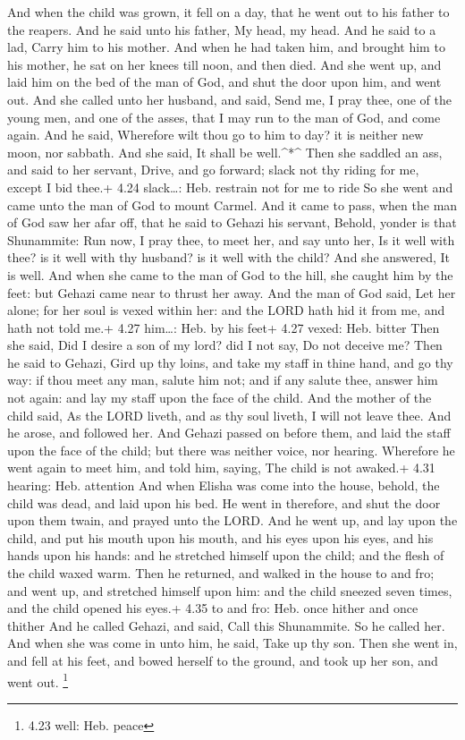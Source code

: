  And when the child was grown, it fell on a day, that he
went out to his father to the reapers.  And he said unto
his father, My head, my head. And he said to a lad, Carry him to his
mother.  And when he had taken him, and brought him to his
mother, he sat on her knees till noon, and then died.  And
she went up, and laid him on the bed of the man of God, and shut the
door upon him, and went out.  And she called unto her
husband, and said, Send me, I pray thee, one of the young men, and one
of the asses, that I may run to the man of God, and come again.
 And he said, Wherefore wilt thou go to him to day? it is
neither new moon, nor sabbath. And she said, It shall be well.\^{}*\^{}
 Then she saddled an ass, and said to her servant, Drive,
and go forward; slack not thy riding for me, except I bid thee.+ 4.24
slack\ldots: Heb. restrain not for me to ride  So she went
and came unto the man of God to mount Carmel. And it came to pass, when
the man of God saw her afar off, that he said to Gehazi his servant,
Behold, yonder is that Shunammite:  Run now, I pray thee,
to meet her, and say unto her, Is it well with thee? is it well with thy
husband? is it well with the child? And she answered, It is well.
 And when she came to the man of God to the hill, she
caught him by the feet: but Gehazi came near to thrust her away. And the
man of God said, Let her alone; for her soul is vexed within her: and
the LORD hath hid it from me, and hath not told me.+ 4.27 him\ldots:
Heb. by his feet+ 4.27 vexed: Heb. bitter  Then she said,
Did I desire a son of my lord? did I not say, Do not deceive me?
 Then he said to Gehazi, Gird up thy loins, and take my
staff in thine hand, and go thy way: if thou meet any man, salute him
not; and if any salute thee, answer him not again: and lay my staff upon
the face of the child.  And the mother of the child said,
As the LORD liveth, and as thy soul liveth, I will not leave thee. And
he arose, and followed her.  And Gehazi passed on before
them, and laid the staff upon the face of the child; but there was
neither voice, nor hearing. Wherefore he went again to meet him, and
told him, saying, The child is not awaked.+ 4.31 hearing: Heb. attention
 And when Elisha was come into the house, behold, the child
was dead, and laid upon his bed.  He went in therefore, and
shut the door upon them twain, and prayed unto the LORD. 
And he went up, and lay upon the child, and put his mouth upon his
mouth, and his eyes upon his eyes, and his hands upon his hands: and he
stretched himself upon the child; and the flesh of the child waxed warm.
 Then he returned, and walked in the house to and fro; and
went up, and stretched himself upon him: and the child sneezed seven
times, and the child opened his eyes.+ 4.35 to and fro: Heb. once hither
and once thither  And he called Gehazi, and said, Call this
Shunammite. So he called her. And when she was come in unto him, he
said, Take up thy son.  Then she went in, and fell at his
feet, and bowed herself to the ground, and took up her son, and went
out. \footnote{4.23 well: Heb. peace}

